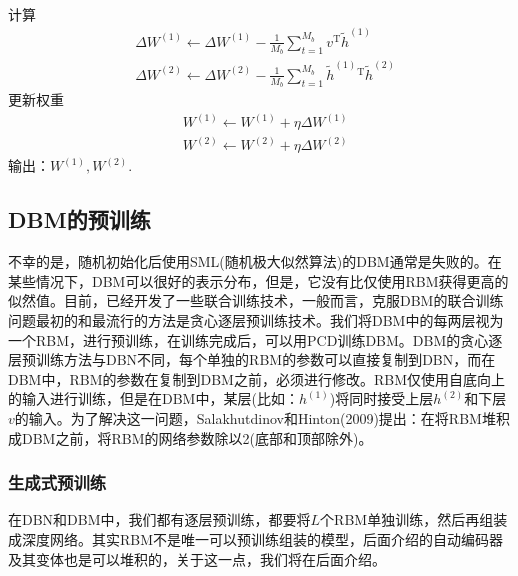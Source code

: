 \begin{algorithm}[htbp]
\begin{algorithmic}[1]
\begin{align*}
                        \end{align*}
                    \EndFor
                    \State 计算
                    \begin{align*}
                    & \Delta W^{(1)} \leftarrow \Delta W^{(1)} - \frac{1}{M_b}\sum_{t=1}^{M_b} v^\mathrm{T}\tilde{h}^{(1)}\\
                    & \Delta W^{(2)} \leftarrow \Delta W^{(2)} - \frac{1}{M_b}\sum_{t=1}^{M_b} \tilde{h}^{(1)}{}^\mathrm{T}\tilde{h}^{(2)}
                    \end{align*}
                    \State 更新权重
                    \begin{align*}
                    & W^{(1)} \leftarrow W^{(1)}  + \eta \Delta W^{(1)}\\
                    & W^{(2)} \leftarrow W^{(2)}  + \eta \Delta W^{(2)}
                    \end{align*}
                \EndWhile
                \State 输出：$W^{(1)},W^{(2)}$.
            \end{algorithmic}
        \end{algorithm}
    \subsection{DBM的预训练}
        \par
        不幸的是，随机初始化后使用SML(随机极大似然算法)的DBM通常是失败的。在某些情况下，DBM可以很好的表示分布，但是，它没有比仅使用RBM获得更高的似然值。目前，已经开发了一些联合训练技术，一般而言，克服DBM的联合训练问题最初的和最流行的方法是贪心逐层预训练技术。我们将DBM中的每两层视为一个RBM，进行预训练，在训练完成后，可以用PCD训练DBM。DBM的贪心逐层预训练方法与DBN不同，每个单独的RBM的参数可以直接复制到DBN，而在DBM中，RBM的参数在复制到DBM之前，必须进行修改。RBM仅使用自底向上的输入进行训练，但是在DBM中，某层(比如：$h^{(1)}$)将同时接受上层$h^{(2)}$和下层$v$的输入。为了解决这一问题，Salakhutdinov和Hinton(2009)提出：在将RBM堆积成DBM之前，将RBM的网络参数除以2(底部和顶部除外)。
        \subsubsection{生成式预训练}
            \par
            在DBN和DBM中，我们都有逐层预训练，都要将$L$个RBM单独训练，然后再组装成深度网络。其实RBM不是唯一可以预训练组装的模型，后面介绍的自动编码器及其变体也是可以堆积的，关于这一点，我们将在后面介绍。
